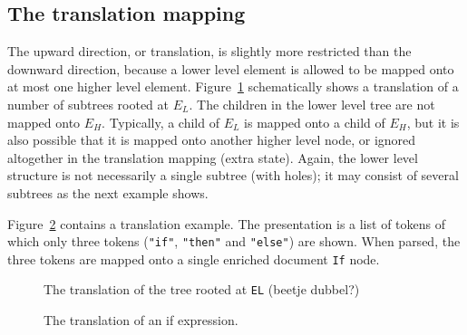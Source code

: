 %																
\subsection{The translation mapping}

The upward direction, or translation, is slightly more restricted than the downward direction, because a lower level element is allowed to be mapped onto at most one higher level element. Figure~\ref{elementTranslation} schematically shows a translation of a number of subtrees rooted at $E_L$. The children in the lower level tree are not mapped onto $E_H$. Typically, a child of $E_L$ is mapped onto a child of $E_H$, but it is also possible that it is mapped onto another higher level node, or ignored altogether in the translation mapping (extra state).  Again, the lower level structure is not necessarily a single subtree (with holes); it may consist of several subtrees as the next example shows.

Figure~\ref{translateExample} contains a translation example. The presentation is a list of tokens of which only three tokens (\verb|"if"|, \verb|"then"| and \verb|"else"|) are shown. When parsed, the three tokens are mapped onto a single enriched document \verb|If| node. 

\begin{figure}
\begin{center}
\begin{center}
%
%
\end{center}
\caption{The translation of the tree rooted at {\tt EL} (beetje dubbel?)}\label{elementTranslation} 
\end{center}
\end{figure}


\toHere     %

\begin{figure}
\begin{center}
\begin{center}
\end{center}
\caption{The translation of an if expression.}\label{translateExample} 
\end{center}
\end{figure}

